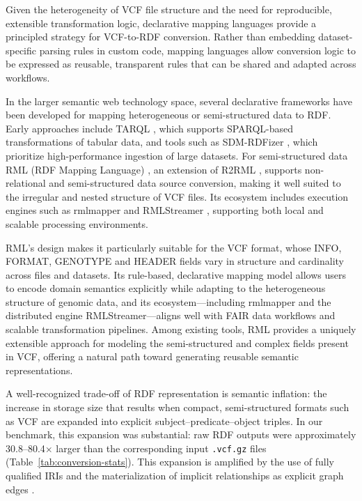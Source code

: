 \documentclass[unnumsec,webpdf,contemporary,large]{oup-authoring-template}
\begin{document}
Given the heterogeneity of VCF file structure and the need for reproducible, extensible transformation logic, declarative mapping languages provide a principled strategy for VCF-to-RDF conversion. 
Rather than embedding dataset-specific parsing rules in custom code, mapping languages allow conversion logic to be expressed as reusable, transparent rules that can be shared and adapted across workflows.

In the larger semantic web technology space, several declarative frameworks have been developed for mapping heterogeneous or semi-structured data to RDF. 
Early approaches include TARQL \cite{tarql}, which supports SPARQL-based transformations of tabular data, and tools such as SDM-RDFizer \cite{sdm-rdfizer_2020}, which prioritize high-performance ingestion of large datasets. 
For semi-structured data RML (RDF Mapping Language) \cite{rml_2024}, an extension of R2RML \cite{r2rml_2012}, supports non-relational and semi-structured data source conversion, making it well suited to the irregular and nested structure of VCF files. 
Its ecosystem includes execution engines such as rmlmapper \cite{rmlmapper-java_2025} and RMLStreamer \cite{rmlstreamer_2022}, supporting both local and scalable processing environments.

RML's design makes it particularly suitable for the VCF format, whose INFO, FORMAT, GENOTYPE and HEADER fields vary in structure and cardinality across files and datasets. 
Its rule-based, declarative mapping model allows users to encode domain semantics explicitly while adapting to the heterogeneous structure of genomic data, and its ecosystem—including rmlmapper and the distributed engine RMLStreamer—aligns well with FAIR data workflows and scalable transformation pipelines. 
Among existing tools, RML provides a uniquely extensible approach for modeling the semi-structured and complex fields present in VCF, offering a natural path toward generating reusable semantic representations.

A well-recognized trade-off of RDF representation is semantic inflation: the increase in storage size that results when compact, semi-structured formats such as VCF are expanded into explicit subject–predicate–object triples. 
In our benchmark, this expansion was substantial: raw RDF outputs were approximately 30.8--80.4$\times$ larger than the corresponding input \texttt{.vcf.gz} files (Table~\ref{tab:conversion-stats}).
This expansion is amplified by the use of fully qualified IRIs and the materialization of implicit relationships as explicit graph edges \cite{rdf}.
\end{document}
